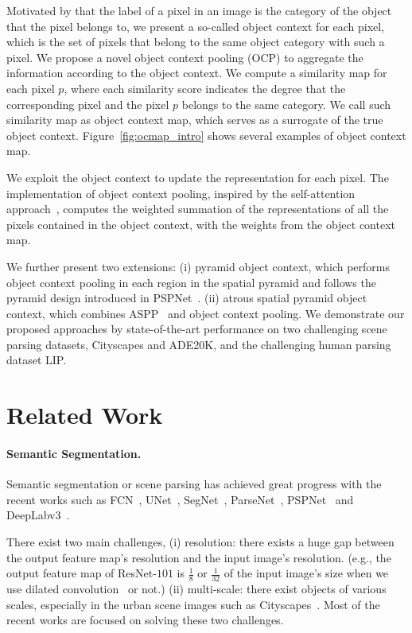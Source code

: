 \documentclass[10pt,twocolumn,letterpaper]{article}
\begin{document}
Motivated by that 
the label of a pixel in an image is 
the category of the object that the pixel belongs to,
we present a so-called object context for each pixel,
which is the set of pixels that belong to the same object category 
with such a pixel.
We propose a novel object context pooling (OCP) to 
aggregate the information according to the object context.
We compute a similarity map for each pixel $p$, 
where each similarity score indicates
the degree that the corresponding pixel and the pixel $p$ belongs
to the same category.
We call such similarity map as object context map,
which serves as a surrogate of the true object context.
Figure~\ref{fig:ocmap_intro}
shows several examples of object context map.

We exploit the object context 
to update the representation for each pixel.
The implementation of object context pooling,
inspired by the self-attention approach~\cite{lin2017structured, vaswani2017attention},
computes the weighted summation of
the representations of all the pixels contained
in the object context,
with the weights from the object context map. 

We further present two extensions:
(i) pyramid object context,
which performs object context pooling 
in each region in the spatial pyramid and follows the pyramid design
introduced in PSPNet~\cite{zhao2017pyramid}. 
(ii) atrous spatial pyramid object context,
which combines ASPP~\cite{chen2017rethinking} and object context pooling.
We demonstrate our proposed approaches
by state-of-the-art performance on two challenging scene parsing datasets, Cityscapes and ADE20K,
and the challenging human parsing dataset LIP.

\section{Related Work}

\paragraph{Semantic Segmentation.}
Semantic segmentation or scene parsing has achieved great progress with the recent works such as FCN~\cite{long2015fully}, UNet~\cite{ronneberger2015u}, SegNet~\cite{badrinarayanan2015segnet}, ParseNet~\cite{liu2015parsenet}, PSPNet~\cite{zhao2017pyramid} and DeepLabv3~\cite{chen2017rethinking}.

There exist two main challenges, (i) resolution: there exists a huge gap between the output feature map's resolution and the input image's resolution. (e.g., the output feature map of ResNet-$101$ is $\frac{1}{8}$ or $\frac{1}{32}$ of the input image's size when we use dilated convolution~\cite{yu2015multi} or not.) 
(ii) multi-scale: there exist objects of various scales, especially in the urban scene images such as Cityscapes~\cite{cordts2016cityscapes}. Most of the recent works are focused on solving these two challenges.
\end{document}
